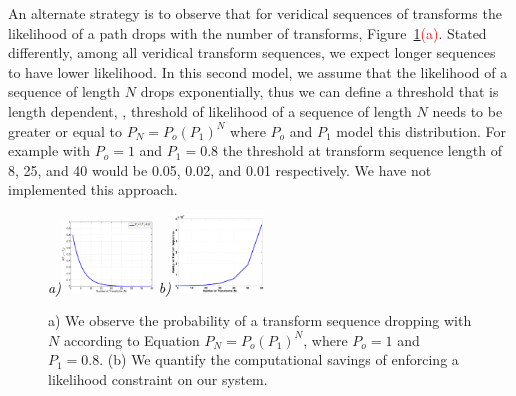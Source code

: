 An alternate strategy is to observe that for veridical sequences of transforms the likelihood of a path drops with the number of transforms, Figure~\ref{fig:seq_vs_N}\textcolor{red}{(a)}. Stated differently, among all veridical transform sequences, we expect longer sequences to have lower likelihood. In this second model, we assume that the likelihood of a sequence of length $N$ drops exponentially, thus we can define a threshold that is length dependent, \ie, threshold of likelihood of a sequence of length $N$ needs to be greater or equal to $P_N=P_o(P_1)^N$ where $P_o$ and $P_1$ model this distribution. For example with $P_o=1$ and $P_1=0.8$ the threshold at transform sequence length of 8, 25, and 40 would be 0.05, 0.02, and 0.01 respectively. We have not implemented this approach.                                 



\begin{figure}[ht]
\centering
{\footnotesize\textit{\textcolor{black}{a)}}}\includegraphics[width=0.22\textwidth]{figs/p_vs_N.pdf}
{\footnotesize\textit{\textcolor{black}{b)}}}\includegraphics[width=0.22\textwidth]{figs/cost_savings.pdf}
\caption{a) We observe the probability of a transform sequence dropping with $N$ according to Equation $P_N=P_o(P_1)^N$, where $P_o=1$ and $P_1=0.8$. (b) We quantify the computational savings of enforcing a likelihood constraint on our system. }
\label{fig:seq_vs_N}
\end{figure}


